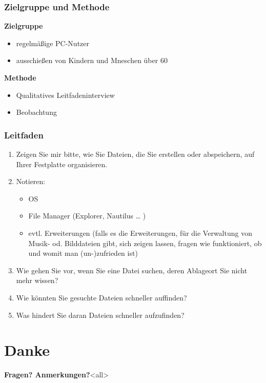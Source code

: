 \begin{frame}

\frametitle{Zielgruppe und Methode}
\label{zielgruppeundmethode}

\textbf{Zielgruppe}

\begin{itemize}
\item regelmäßige PC-Nutzer

\item ausschießen von Kindern und Mneschen über 60

\end{itemize}

\textbf{Methode}

\begin{itemize}
\item Qualitatives Leitfadeninterview

\item Beobachtung

\end{itemize}

\end{frame}

\begin{frame}

\frametitle{Leitfaden}
\label{leitfaden}

\begin{enumerate}
\item Zeigen Sie mir bitte, wie Sie Dateien, die Sie erstellen oder abspeichern, auf Ihrer
Festplatte organisieren. 

\item Notieren:

\begin{itemize}
\item OS

\item File Manager (Explorer, Nautilus {\ldots} )

\item evtl. Erweiterungen (falls es die Erweiterungen, für die Verwaltung von Musik- od. Bilddateien gibt, sich zeigen lassen, fragen wie funktioniert, ob und womit man (un-)zufrieden ist)

\end{itemize}

\item Wie gehen Sie vor, wenn Sie eine Datei suchen, deren Ablageort Sie nicht mehr wissen?

\item Wie könnten Sie gesuchte Dateien schneller auffinden?

\item Was hindert Sie daran Dateien schneller aufzufinden?

\end{enumerate}

\end{frame}

\section{Danke}
\label{danke}

\textbf{Fragen? Anmerkungen?}\mode<all>




\mode*

